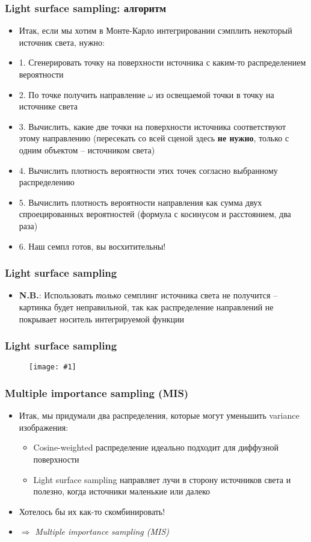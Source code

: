 \documentclass[10pt]{beamer}
\newcommand{\slideimage}[1]{
  \begin{figure}
    \begin{adjustbox}{width=\textwidth, totalheight=\textheight-2\baselineskip-2\baselineskip,keepaspectratio}
      \texttt{[image: \#1]}
    \end{adjustbox}
  \end{figure}
}
\begin{document}
\begin{frame}
\frametitle{Light surface sampling: алгоритм}
\begin{itemize}
\item Итак, если мы хотим в Монте-Карло интегрировании сэмплить некоторый источник света, нужно:
\pause
\item 1. Сгенерировать точку на поверхности источника с каким-то распределением вероятности
\pause
\item 2. По точке получить направление \begin{math}\omega\end{math} из освещаемой точки в точку на источнике света
\pause
\item 3. Вычислить, какие две точки на поверхности источника соответствуют этому направлению (пересекать со всей сценой здесь \textbf{не нужно}, только с одним объектом -- источником света)
\pause
\item 4. Вычислить плотность вероятности этих точек согласно выбранному распределению
\pause
\item 5. Вычислить плотность вероятности направления как сумма двух спроецированных вероятностей (формула с косинусом и расстоянием, два раза)
\pause
\item 6. Наш семпл готов, вы восхитительны!
\end{itemize}
\end{frame}

\begin{frame}
\frametitle{Light surface sampling}
\begin{itemize}
\item \textbf{\alert{N.B.}}: Использовать \textit{только} семплинг источника света не получится -- картинка будет неправильной, так как распределение направлений не покрывает носитель интегрируемой функции
\end{itemize}
\end{frame}

\begin{frame}
\frametitle{Light surface sampling}
\slideimage{only_light_1024.png}
\end{frame}

\begin{frame}
\frametitle{Multiple importance sampling (MIS)}
\begin{itemize}
\item Итак, мы придумали два распределения, которые могут уменьшить variance изображения:
\pause
\begin{itemize}
\item Cosine-weighted распределение идеально подходит для диффузной поверхности
\pause
\item Light surface sampling направляет лучи в сторону источников света и полезно, когда источники маленькие или далеко
\end{itemize}
\pause
\item Хотелось бы их как-то скомбинировать!
\pause
\item \begin{math}\Longrightarrow\end{math} \textit{Multiple importance sampling (MIS)}
\end{itemize}
\end{frame}
\end{document}
